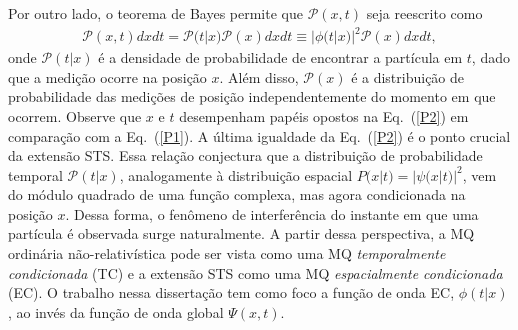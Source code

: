 Por outro lado, o teorema de Bayes permite que ${\mathcal P}(x,t)$ seja reescrito como
\begin{eqnarray}
\label{P2}
{\mathcal P}(x,t)dxdt={\mathcal P}(t|x){\mathcal P}(x)dxdt \equiv|\phi(t|x)|^2 {\mathcal P}( x)dxdt,
\end{eqnarray}
onde ${\mathcal P}(t|x)$ é a densidade de probabilidade de encontrar a partícula em $t$, dado que a medição ocorre na posição $x$. Além disso, ${\mathcal P}(x)$ é a distribuição de probabilidade das medições de posição independentemente do momento em que ocorrem. Observe que $x$ e $t$ desempenham papéis opostos na Eq.~(\ref{P2}) em comparação com a Eq.~(\ref{P1}). A última igualdade da Eq.~(\ref{P2}) é o ponto crucial da extensão STS. Essa relação conjectura que a distribuição de probabilidade temporal ${\mathcal P}(t|x)$, analogamente à distribuição espacial $P(x|t)=|\psi(x|t)|^2$, vem do módulo quadrado de uma função complexa, mas agora condicionada na posição $x$. Dessa forma, o fenômeno de interferência do instante em que uma partícula é observada surge naturalmente. A partir dessa perspectiva, a MQ ordinária não-relativística pode ser vista como uma MQ \textit{temporalmente condicionada} (TC) e a extensão STS como uma MQ \textit{espacialmente condicionada} (EC). O trabalho nessa dissertação tem como foco a função de onda EC, $\phi(t|x)$, ao invés da função de onda global $\Psi(x,t)$.





